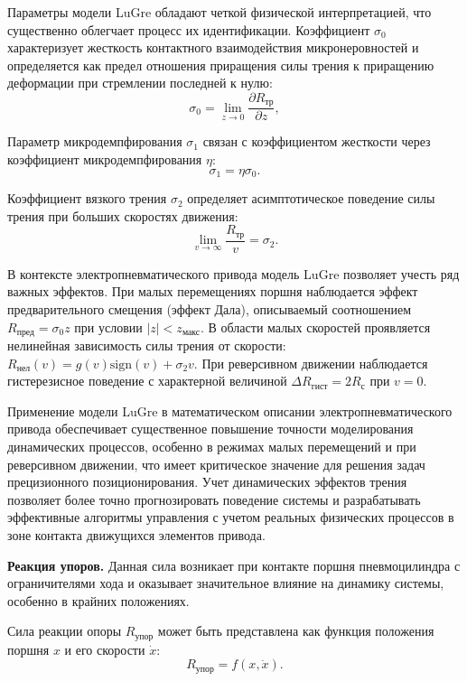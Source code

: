Параметры модели LuGre обладают четкой физической интерпретацией, что существенно облегчает процесс их идентификации.
Коэффициент $\sigma_0$ характеризует жесткость контактного взаимодействия микронеровностей и
определяется как предел отношения приращения силы трения к приращению деформации при стремлении последней к нулю:
\begin{equation}
	\label{eq:ch2/stiffness}
	\sigma_0 = \lim_{z \to 0} \frac{\partial R_\text{тр}}{\partial z},
\end{equation}

Параметр микродемпфирования $\sigma_1$ связан с коэффициентом жесткости через коэффициент микродемпфирования $\eta$:
\begin{equation}
	\sigma_1 = \eta\sigma_0.
\end{equation}

Коэффициент вязкого трения $\sigma_2$ определяет асимптотическое поведение силы трения при больших скоростях движения:
\begin{equation}
	\lim_{v \to \infty} \frac{R_\text{тр}}{v} = \sigma_2.
\end{equation}

В контексте электропневматического привода модель LuGre позволяет учесть ряд важных эффектов.
При малых перемещениях поршня наблюдается эффект предварительного смещения (эффект Дала), описываемый
соотношением $R_\text{пред} = \sigma_0z$ при условии $|z| < z_\text{макс}$. В области малых скоростей проявляется
нелинейная зависимость силы трения от скорости: $R_\text{нел}(v) = g(v)\text{sign}(v) + \sigma_2v$. При
реверсивном движении наблюдается гистерезисное поведение с характерной величиной $\Delta R_\text{гист} = 2R_\text{с}$ при $v = 0$.

Применение модели LuGre в математическом описании электропневматического привода обеспечивает существенное
повышение точности моделирования динамических процессов, особенно в режимах малых перемещений и при
реверсивном движении, что имеет критическое значение для решения задач прецизионного позиционирования.
Учет динамических эффектов трения позволяет более точно прогнозировать поведение системы и разрабатывать
эффективные алгоритмы управления с учетом реальных физических процессов в зоне контакта движущихся элементов привода.

\textbf{Реакция упоров.}
Данная сила возникает при контакте поршня пневмоцилиндра
с ограничителями хода и оказывает значительное влияние на динамику системы, особенно в крайних положениях.

Сила реакции опоры $R_\text{упор}$ может быть представлена как функция положения поршня $x$ и его скорости $\dot{x}$:
\begin{equation}
	R_\text{упор} = f(x, \dot{x}).
\end{equation}

